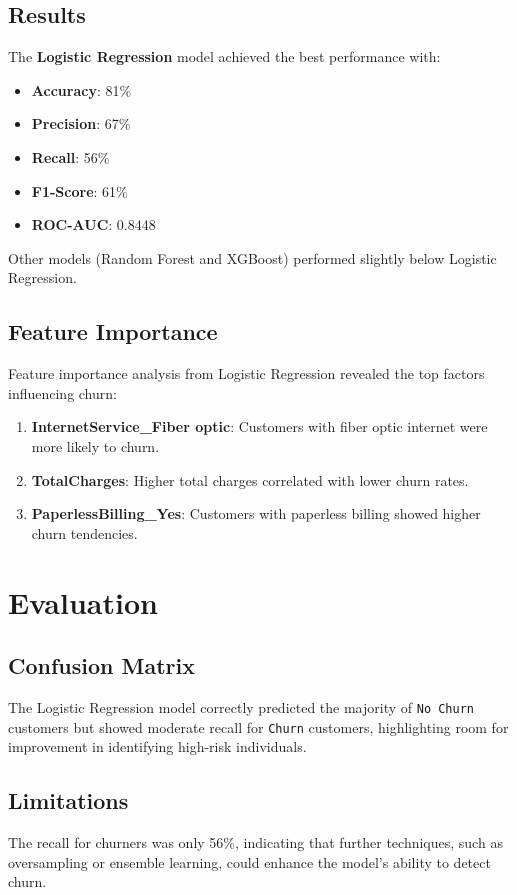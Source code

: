 \documentclass[12pt]{article}
\begin{document}
\subsection{Results}
The \textbf{Logistic Regression} model achieved the best performance with:
\begin{itemize}
    \item \textbf{Accuracy}: 81\%
    \item \textbf{Precision}: 67\%
    \item \textbf{Recall}: 56\%
    \item \textbf{F1-Score}: 61\%
    \item \textbf{ROC-AUC}: 0.8448
\end{itemize}

Other models (Random Forest and XGBoost) performed slightly below Logistic Regression.

\subsection{Feature Importance}
Feature importance analysis from Logistic Regression revealed the top factors influencing churn:
\begin{enumerate}
    \item \textbf{InternetService\_Fiber optic}: Customers with fiber optic internet were more likely to churn.
    \item \textbf{TotalCharges}: Higher total charges correlated with lower churn rates.
    \item \textbf{PaperlessBilling\_Yes}: Customers with paperless billing showed higher churn tendencies.
\end{enumerate}

\section{Evaluation}

\subsection{Confusion Matrix}
The Logistic Regression model correctly predicted the majority of \texttt{No Churn} customers but showed moderate recall for \texttt{Churn} customers, highlighting room for improvement in identifying high-risk individuals.

\subsection{Limitations}
The recall for churners was only 56\%, indicating that further techniques, such as oversampling or ensemble learning, could enhance the model’s ability to detect churn.
\end{document}
